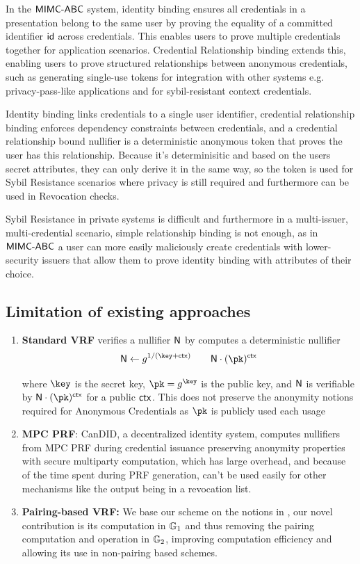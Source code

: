 In the $\mathsf{MIMC\text{-}ABC}$ system, identity binding ensures all credentials in a presentation belong to the same user by proving the equality of a committed identifier $\mathsf{id}$ across credentials. This enables users to prove multiple credentials together for application scenarios.
Credential Relationship binding extends this, enabling users to prove structured relationships between anonymous credentials, such as generating single-use tokens for integration with other systems e.g. privacy-pass-like applications \cite{davidson2018privacy} and for sybil-resistant context credentials.

Identity binding links credentials to a single user identifier, credential relationship binding enforces dependency constraints between credentials, and a credential relationship bound nullifier is a deterministic anonymous token that proves the user has this relationship. Because it's determinisitic and based on the users secret attributes, they can only derive it in the same way, so the token is used for Sybil Resistance scenarios where privacy is still required and furthermore can be used in Revocation checks.

Sybil Resistance in private systems is difficult and furthermore in a multi-issuer, multi-credential scenario, simple relationship binding is not enough, as in $\mathsf{MIMC\text{-}ABC}$ a user can more easily maliciously create credentials with lower-security issuers that allow them to prove identity binding with attributes of their choice. 

\subsection{Limitation of existing approaches}
\begin{enumerate}
    \item \textbf{Standard VRF} verifies a nullifier $\mathsf{N}$ by computes a deterministic nullifier
    \[
        \nul \gets g^{1/(\key + \ctx)}    \qquad \nul \cdot (\pk)^{\ctx}
    \]
    
    where $\key$ is the secret key, $\pk = g^{\key}$ is the public key, and $\mathsf{N}$ is verifiable by $\nul \cdot (\pk)^{\ctx}$ for a public $\mathsf{ctx}$. This does not preserve the anonymity notions required for Anonymous Credentials as $\pk$ is publicly used each usage
    
    \item \textbf{MPC PRF}: CanDID, a decentralized identity system, computes nullifiers from MPC PRF during credential issuance preserving anonymity properties with secure multiparty computation, which has large overhead, and because of the time spent during PRF generation, can't be used easily for other mechanisms like the output being in a revocation list.
    
    \item \textbf{Pairing-based VRF:}  We base our scheme on the notions in \cite{tomescu2022utt}, our novel contribution is its computation in $\mathbb{G}_1$ and thus removing the pairing computation and operation in $\mathbb{G}_2$, improving computation efficiency and allowing its use in non-pairing based schemes.
\end{enumerate}

